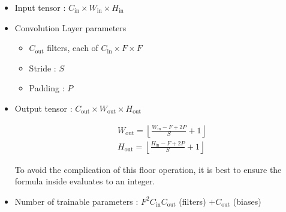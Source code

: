 \documentclass{report}
\begin{document}
\begin{concept}
    \begin{itemize}
        \item Input tensor : $C_{\text {in}} \times W_{\text {in}} \times H_{\text {in}}$
        \item
        Convolution Layer parameters

        \begin{itemize}
            \item $C_{\text {out}}$ filters, each of $C_{\text {in}} \times F \times F$
            \item Stride : $S$
            \item Padding : $P$
        \end{itemize}
        \item
        Output tensor : $C_{\text {out}} \times W_{\text {out}} \times H_{\text {out}}$

        $$
        \begin{aligned}
        & W_{\text{out}}=\left\lfloor\frac{W_{\text{in}}-F+2 P}{S}+1\right\rfloor \\
        & H_{\text{out}}=\left\lfloor\frac{H_{\text{in}}-F+2 P}{S}+1\right\rfloor
        \end{aligned}
        $$

        To avoid the complication of this floor operation, it is best to ensure the formula inside evaluates to an integer.
        \item Number of trainable parameters : $F^2 C_{\text{in}} C_{\text{out}}$ (filters) $+ C_{\text{out}}$ (biases)
    \end{itemize}
\end{concept}
\end{document}

